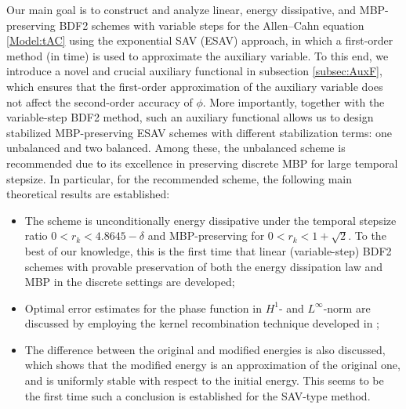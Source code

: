 \documentclass{m2an}
\begin{document}
Our main goal is to construct and analyze linear, energy dissipative, and MBP-preserving BDF2 schemes with variable steps for the Allen--Cahn equation \eqref{Model:tAC} using the exponential SAV (ESAV) approach, in which a first-order method (in time) is used to approximate the auxiliary variable. To this end, we introduce a novel and crucial auxiliary functional in subsection \ref{subsec:AuxF}, which ensures that the first-order approximation of the auxiliary variable does not affect the second-order accuracy of $ \phi $. More importantly, together with the variable-step BDF2 method, such an auxiliary functional allows us to design stabilized MBP-preserving ESAV schemes with different stabilization terms: one unbalanced and two balanced. Among these, the unbalanced scheme is recommended due to its excellence in preserving discrete MBP for large temporal stepsize. In particular, for the recommended scheme, the following main theoretical results are established:
\begin{itemize}
	\item The scheme is unconditionally energy dissipative under the temporal stepsize ratio $ 0< r_{k} < 4.8645 - \delta $ and MBP-preserving for $ 0< r_{k} < 1 + \sqrt{2} $. To the best of our knowledge, this is the first time that linear (variable-step) BDF2 schemes with provable preservation of both the energy dissipation law and MBP in the discrete settings are developed;
	
	\item Optimal error estimates for the phase function in $H^{1}$- and $ L^{\infty} $-norm are discussed by employing the kernel recombination technique developed in 
	\cite{MOC_2023_Ju,SINUM_2020_Liao,SISC_2016_Xu};
	
	\item The difference between the original and modified energies is also discussed, which shows that the modified energy is an approximation of the original one, and  is uniformly stable with respect to the initial energy. This seems to be the first time such a conclusion is established for the SAV-type method.
\end{itemize}

\end{document}
